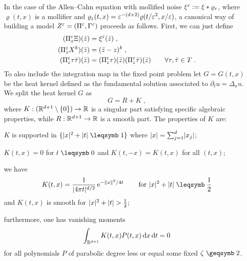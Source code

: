 \documentclass[reqno,11pt]{article}
\begin{document}
In the case of the Allen--Cahn equation with mollified noise $\xi^\varepsilon:=\xi *
\varrho_\varepsilon$, where $\varrho(t,x)$ is a mollifier and
$\varrho_\varepsilon(t,x)=\varepsilon^{-(d+2)}\varrho(t/\varepsilon^2,x/\varepsilon)$, a canonical way of
building a model $Z^\varepsilon=(\Pi^\varepsilon,\Gamma^\varepsilon)$ proceeds as follows.
First, we can just define 
\begin{align}
\nonumber
(\Pi^\eps_z\Xi)(\bar z) &= \xi^\eps(\bar z)\;, \\
\nonumber
(\Pi^\eps_z X^k)(\bar z) &= (\bar z-z)^k\;, \\
\label{eq:Pi_x} 
(\Pi^\eps_z \tau\bar\tau)(\bar z) &= (\Pi^\eps_z \tau)(\bar z)(\Pi^\eps_z
\bar\tau)(\bar z)
\qquad\forall\tau,\bar\tau\in T\;. 
\end{align}
To also include the integration map in the fixed point problem let $G=G(t,x)$ be the heat kernel 
defined as the fundamental solution associated to $\partial_t u = \Delta_x u$. We split the heat
kernel $G$ as 
\begin{equation}
 \label{eq:splitG}
 G =R + K\;,
\end{equation}
where $K:(\mathbb{R}^{d+1}\setminus\{0\})\rightarrow \mathbb{R}$ is a singular part satisfying specific algebraic properties, while
$R:\mathbb{R}^{d+1}\rightarrow \mathbb{R}$ is a smooth part. The properties of $K$ are: 
\begin{itemizz}
\item 	$K$ is supported in $\set{\abs{x}^2 + \abs{t} \leqs 1}$ where 
$\lvert x\rvert=\sum_{j=1}^d\lvert x_j\rvert$;
\item 	$K(t,x)=0$ for $t\leqs0$ and $K(t,-x)=K(t,x)$ for all $(t,x)$;
\item we have	
\begin{equation}
 \label{eq:K01}
 K(t,x) = \frac{1}{\abs{4\pi t}^{d/2}} \e^{-\norm{x}^2/4t}
 \qquad
 \text{for $\abs{x}^2+\abs{t} \leqs \frac12$}
\end{equation}
and $K(t,x)$ is smooth for $\lvert x\rvert^2+\lvert t\rvert > \frac12$;
\item furthermore, one has vanishing moments
\begin{equation}
 \label{eq:K02}
 \int_{\R^{d+1}} K(t,x)P(t,x) \6x\6t = 0
\end{equation}
for all polynomials $P$ of parabolic degree less or equal some
fixed $\zeta\geqs2$.
\end{itemizz}
\end{document}
